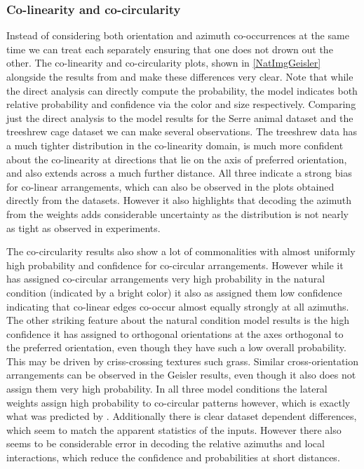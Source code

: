 \subsubsection{Co-linearity and co-circularity}

Instead of considering both orientation and azimuth co-occurrences at
the same time we can treat each separately ensuring that one does not
drown out the other. The co-linearity and co-circularity plots, shown
in \ref{NatImgGeisler} alongside the results from \cite{Geisler2001}
and \cite{Perrinet2015} make these differences very clear. Note that
while the direct analysis can directly compute the probability, the
model indicates both relative probability and confidence via the color
and size respectively. Comparing just the direct analysis to the model
results for the Serre animal dataset and the treeshrew cage dataset we
can make several observations. The treeshrew data has a much tighter
distribution in the co-linearity domain, is much more confident about
the co-linearity at directions that lie on the axis of preferred
orientation, and also extends across a much further distance. All
three indicate a strong bias for co-linear arrangements, which can
also be observed in the plots obtained directly from the
datasets. However it also highlights that decoding the azimuth from
the weights adds considerable uncertainty as the distribution is not
nearly as tight as observed in experiments.

The co-circularity results also show a lot of commonalities with
almost uniformly high probability and confidence for co-circular
arrangements. However while it has assigned co-circular arrangements
very high probability in the natural condition (indicated by a bright
color) it also as assigned them low confidence indicating that
co-linear edges co-occur almost equally strongly at all azimuths. The
other striking feature about the natural condition model results is
the high confidence it has assigned to orthogonal orientations at the
axes orthogonal to the preferred orientation, even though they have
such a low overall probability. This may be driven by criss-crossing
textures such grass. Similar cross-orientation arrangements can be
observed in the Geisler results, even though it also does not assign
them very high probability. In all three model conditions the lateral
weights assign high probability to co-circular patterns however, which
is exactly what was predicted by \citep{Geisler2001}. Additionally
there is clear dataset dependent differences, which seem to match the
apparent statistics of the inputs. However there also seems to be
considerable error in decoding the relative azimuths and local
interactions, which reduce the confidence and probabilities at short
distances.

